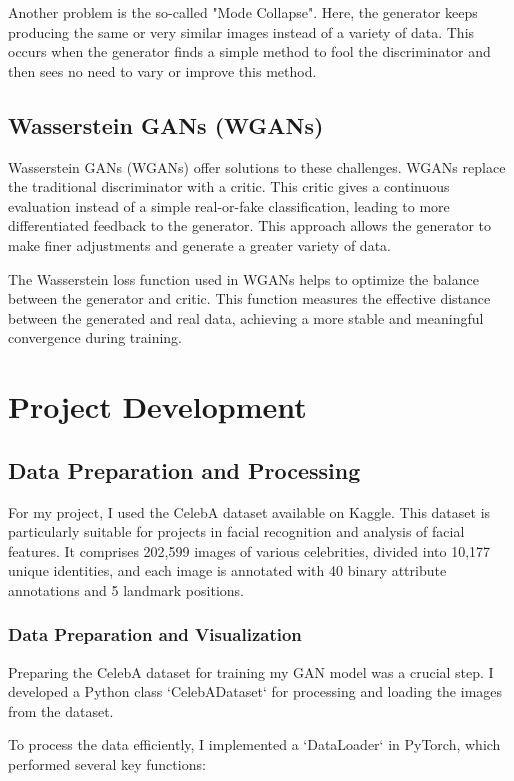 \documentclass[a4paper, 12pt]{article}
\begin{document}
Another problem is the so-called "Mode Collapse"\cite{mathworks_gan_training}. Here, the generator keeps producing the same or very similar images instead of a variety of data. This occurs when the generator finds a simple method to fool the discriminator and then sees no need to vary or improve this method.

\subsection{Wasserstein GANs (WGANs)}
Wasserstein GANs (WGANs) offer solutions to these challenges.\cite{ar5iv_dynamic_discriminator}\cite{ar5iv_contrastive_discriminator} WGANs replace the traditional discriminator with a critic. This critic gives a continuous evaluation instead of a simple real-or-fake classification, leading to more differentiated feedback to the generator. This approach allows the generator to make finer adjustments and generate a greater variety of data.

The Wasserstein loss function used in WGANs helps to optimize the balance between the generator and critic. This function measures the effective distance between the generated and real data, achieving a more stable and meaningful convergence during training.

\section{Project Development}
\subsection{Data Preparation and Processing}

For my project, I used the CelebA dataset available on Kaggle. This dataset is particularly suitable for projects in facial recognition and analysis of facial features. It comprises 202,599 images of various celebrities, divided into 10,177 unique identities, and each image is annotated with 40 binary attribute annotations and 5 landmark positions.

\subsubsection{Data Preparation and Visualization}
Preparing the CelebA dataset for training my GAN model was a crucial step. I developed a Python class `CelebADataset` for processing and loading the images from the dataset.

To process the data efficiently, I implemented a `DataLoader` in PyTorch, which performed several key functions:
\end{document}

